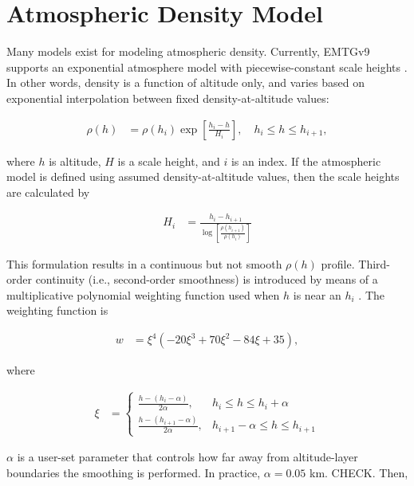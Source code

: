 \documentclass[]{article}
\begin{document}
\section{Atmospheric Density Model}
\label{sec:atmospheric_density_model}

Many models exist for modeling atmospheric density. Currently, EMTGv9 supports an exponential atmosphere model with piecewise-constant scale heights \cite{sme}. In other words, density is a function of altitude only, and varies based on exponential interpolation between fixed density-at-altitude values:

\begin{align}
	\rho (h) &= \rho \left( h_i \right) \exp \left[ \frac{h_i - h}{H_i} \right], \quad h_i \leq h \leq h_{i+1},
\end{align}

\noindent where $h$ is altitude, $H$ is a scale height, and $i$ is an index. If the atmospheric model is defined using assumed density-at-altitude values, then the scale heights are calculated by

\begin{align}
	H_i &= \frac{ h_i - h_{i+1}}{\log \left[ \frac{\rho \left( h_{i+1} \right)}{\rho \left(h_i \right)} \right]}
\end{align}

\noindent This formulation results in a continuous but not smooth $\rho (h)$ profile. Third-order continuity (i.e., second-order smoothness) is introduced by means of a multiplicative polynomial weighting function used when $h$ is near an $h_i$ \cite{hatten:asr2017, jancaitis:jgr1974}. The weighting function is

\begin{align}
	w &= \xi^4 \left( -20 \xi^3 + 70 \xi^2 - 84 \xi + 35 \right),
\end{align}

\noindent where

\begin{align}
	\xi &= \begin{cases}
	\frac{h - \left(h_i - \alpha \right)}{2 \alpha}, & h_i \leq h \leq h_i + \alpha \\
	\frac{h - \left( h_{i + 1} - \alpha \right)}{2 \alpha}, & h_{i+1} - \alpha \leq h \leq h_{i+1}
	\end{cases}
\end{align}

\noindent $\alpha$ is a user-set parameter that controls how far away from altitude-layer boundaries the smoothing is performed. In practice, $\alpha = 0.05$ km. CHECK. Then,
\end{document}
